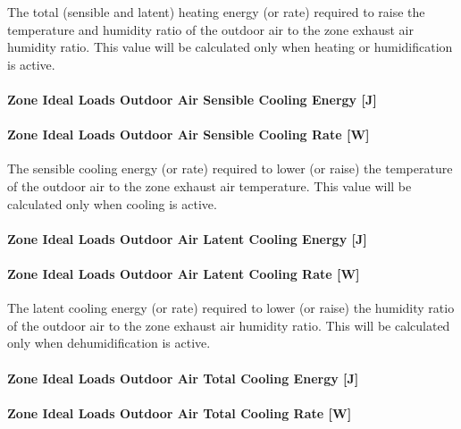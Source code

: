 The total (sensible and latent) heating energy (or rate) required to raise the temperature and humidity ratio of the outdoor air to the zone exhaust air humidity ratio. This value will be calculated only when heating or humidification is active.

\paragraph{Zone Ideal Loads Outdoor Air Sensible Cooling Energy {[}J{]}}\label{zone-ideal-loads-outdoor-air-sensible-cooling-energy-j}

\paragraph{Zone Ideal Loads Outdoor Air Sensible Cooling Rate {[}W{]}}\label{zone-ideal-loads-outdoor-air-sensible-cooling-rate-w}

The sensible cooling energy (or rate) required to lower (or raise) the temperature of the outdoor air to the zone exhaust air temperature. This value will be calculated only when cooling is active.

\paragraph{Zone Ideal Loads Outdoor Air Latent Cooling Energy {[}J{]}}\label{zone-ideal-loads-outdoor-air-latent-cooling-energy-j}

\paragraph{Zone Ideal Loads Outdoor Air Latent Cooling Rate {[}W{]}}\label{zone-ideal-loads-outdoor-air-latent-cooling-rate-w}

The latent cooling energy (or rate) required to lower (or raise) the humidity ratio of the outdoor air to the zone exhaust air humidity ratio. This will be calculated only when dehumidification is active.

\paragraph{Zone Ideal Loads Outdoor Air Total Cooling Energy {[}J{]}}\label{zone-ideal-loads-outdoor-air-total-cooling-energy-j}

\paragraph{Zone Ideal Loads Outdoor Air Total Cooling Rate {[}W{]}}\label{zone-ideal-loads-outdoor-air-total-cooling-rate-w}

